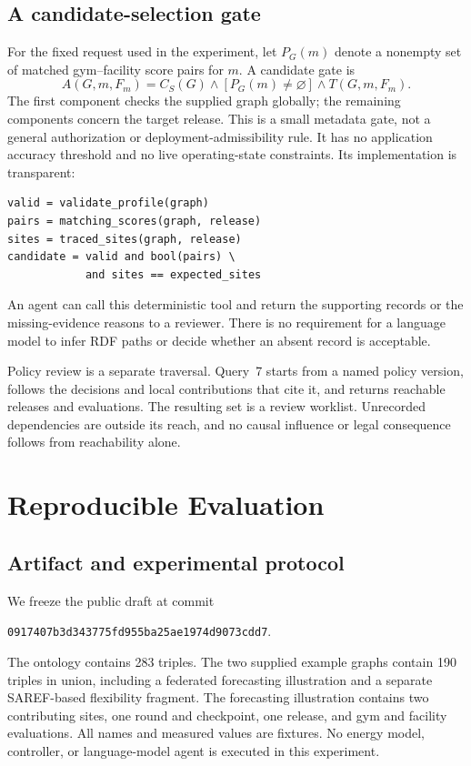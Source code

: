 \documentclass[conference]{IEEEtran}
\begin{document}
\subsection{A candidate-selection gate}
For the fixed request used in the experiment, let $P_G(m)$ denote a nonempty set of matched gym--facility score pairs for $m$. A candidate gate is
\begin{equation}
 A(G,m,F_m)=C_S(G)\land[P_G(m)\ne\varnothing]\land T(G,m,F_m).
\label{eq:gate}
\end{equation}
The first component checks the supplied graph globally; the remaining components concern the target release. This is a small metadata gate, not a general authorization or deployment-admissibility rule. It has no application accuracy threshold and no live operating-state constraints. Its implementation is transparent:
\begin{lstlisting}
valid = validate_profile(graph)
pairs = matching_scores(graph, release)
sites = traced_sites(graph, release)
candidate = valid and bool(pairs) \
            and sites == expected_sites
\end{lstlisting}
An agent can call this deterministic tool and return the supporting records or the missing-evidence reasons to a reviewer. There is no requirement for a language model to infer RDF paths or decide whether an absent record is acceptable.

Policy review is a separate traversal. Query~7 starts from a named policy version, follows the decisions and local contributions that cite it, and returns reachable releases and evaluations. The resulting set is a review worklist. Unrecorded dependencies are outside its reach, and no causal influence or legal consequence follows from reachability alone.

\section{Reproducible Evaluation}
\subsection{Artifact and experimental protocol}
We freeze the public draft at commit
\begin{center}\scriptsize\texttt{0917407b3d343775fd955ba25ae1974d9073cdd7}.\end{center}
The ontology contains 283 triples. The two supplied example graphs contain 190 triples in union, including a federated forecasting illustration and a separate SAREF-based flexibility fragment. The forecasting illustration contains two contributing sites, one round and checkpoint, one release, and gym and facility evaluations. All names and measured values are fixtures. No energy model, controller, or language-model agent is executed in this experiment.
\end{document}
